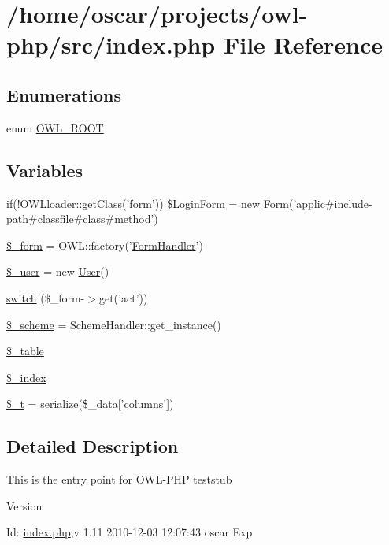\section{/home/oscar/projects/owl-\/php/src/index.php File Reference}
\label{index_8php}
\subsection*{Enumerations}
\begin{DoxyCompactItemize}
\item 
enum \hyperlink{index_8php_a35612f9a6bd7277982731a74593272c4}{OWL\_\-ROOT} 
\end{DoxyCompactItemize}
\subsection*{Variables}
\begin{DoxyCompactItemize}
\item 
\hyperlink{OWLloader_8php_a78407183564d6b92f2219d8a10b9349c}{if}(!OWLloader::getClass('form')) \hyperlink{index_8php_ae89d28a5f6ccd73a8cb4a0253db78766}{\$LoginForm} = new \hyperlink{classForm}{Form}('applic\#include-\/path\#classfile\#class\#method')
\item 
\hyperlink{index_8php_ab14b242803551e0f269742a7103f149d}{\$\_\-form} = OWL::factory('\hyperlink{classFormHandler}{FormHandler}')
\item 
\hyperlink{index_8php_a5df5982b9dadc74df05081972cd67fdf}{\$\_\-user} = new \hyperlink{classUser}{User}()
\item 
\hyperlink{index_8php_aa284f7d5270c1aa684d885f7bb70d532}{switch} (\$\_\-form-\/$>$get('act'))
\item 
\hyperlink{index_8php_abb5321c25f21f089f5c253d5f2697502}{\$\_\-scheme} = SchemeHandler::get\_\-instance()
\item 
\hyperlink{index_8php_ac0ee5b766d19cb282552a3449a1f8376}{\$\_\-table}
\item 
\hyperlink{index_8php_a8fba9293fc0e3b428610c8208c00297d}{\$\_\-index}
\item 
\hyperlink{index_8php_a7a22c26026cc0626b015085e752b45cb}{\$\_\-t} = serialize(\$\_\-data\mbox{[}'columns'\mbox{]})
\end{DoxyCompactItemize}


\subsection{Detailed Description}
This is the entry point for OWL-\/PHP teststub \begin{DoxyVersion}{Version}

\end{DoxyVersion}
\begin{DoxyParagraph}{Id:}
\hyperlink{index_8php}{index.php},v 1.11 2010-\/12-\/03 12:07:43 oscar Exp 
\end{DoxyParagraph}


